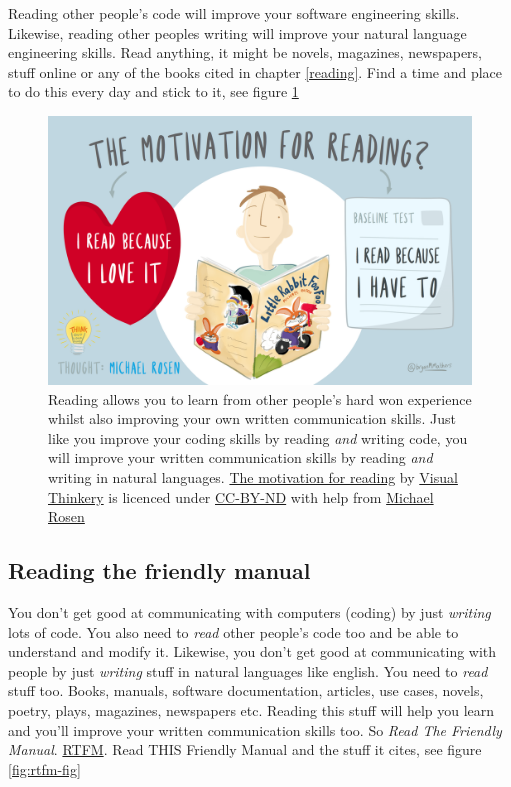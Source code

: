 \documentclass[
]{book}
\begin{document}
Reading other people's code will improve your software engineering skills. Likewise, reading other peoples writing will improve your natural language engineering skills. Read anything, it might be novels, magazines, newspapers, stuff online or any of the books cited in chapter \ref{reading}. Find a time and place to do this every day and stick to it, see figure \ref{fig:reading-fig}

\begin{figure}

{\centering \includegraphics[width=1\linewidth]{images/the-motivation-for-reading} 

}

\caption{Reading allows you to learn from other people's hard won experience whilst also improving your own written communication skills. Just like you improve your coding skills by reading \emph{and} writing code, you will improve your written communication skills by reading \emph{and} writing in natural languages. \href{https://bryanmmathers.com/the-motivation-for-reading/}{The motivation for reading} by \href{https://visualthinkery.com/}{Visual Thinkery} is licenced under \href{https://creativecommons.org/licenses/by-nd/4.0/}{CC-BY-ND} with help from \href{https://en.wikipedia.org/wiki/Michael_Rosen}{Michael Rosen}}\label{fig:reading-fig}
\end{figure}



\hypertarget{rtfm}{%
\subsection{Reading the friendly manual}\label{rtfm}}

You don't get good at communicating with computers (coding) by just \emph{writing} lots of code. You also need to \emph{read} other people's code too and be able to understand and modify it. Likewise, you don't get good at communicating with people by just \emph{writing} stuff in natural languages like english. You need to \emph{read} stuff too. Books, manuals, software documentation, articles, use cases, novels, poetry, plays, magazines, newspapers etc. Reading this stuff will help you learn and you'll improve your written communication skills too. So \emph{Read The Friendly Manual}. \href{https://en.wikipedia.org/wiki/RTFM}{RTFM}. Read THIS Friendly Manual and the stuff it cites, see figure \ref{fig:rtfm-fig}
\end{document}
